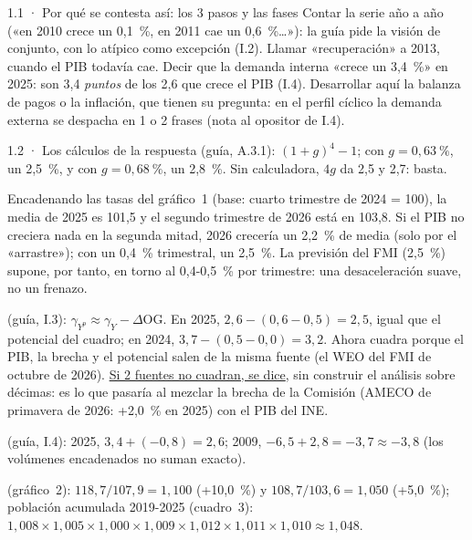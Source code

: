 \begin{complemento}{1.1 · Por qué se contesta así: los 3 pasos y las fases}
 Contar la serie año a año («en 2010 crece un 0,1~\%, en 2011 cae un 0,6~\%…»): la guía pide la visión de conjunto, con lo atípico como excepción (I.2). Llamar «recuperación» a 2013, cuando el PIB todavía cae. Decir que la demanda interna «crece un 3,4~\%» en 2025: son 3,4 \emph{puntos} de los 2,6 que crece el PIB (I.4). Desarrollar aquí la balanza de pagos o la inflación, que tienen su pregunta: en el perfil cíclico la demanda externa se despacha en 1 o 2 frases (nota al opositor de I.4).
\end{complemento}
\begin{complemento}{1.2 · Los cálculos de la respuesta}
 (guía, A.3.1): $(1+g)^4-1$; con $g=0{,}63~\%$, un 2,5~\%, y con $g=0{,}68~\%$, un 2,8~\%. Sin calculadora, $4g$ da 2,5 y 2,7: basta.

 Encadenando las tasas del gráfico~1 (base: cuarto trimestre de 2024 = 100), la media de 2025 es 101,5 y el segundo trimestre de 2026 está en 103,8. Si el PIB no creciera nada en la segunda mitad, 2026 crecería un 2,2~\% de media (solo por el «arrastre»); con un 0,4~\% trimestral, un 2,5~\%. La previsión del FMI (2,5~\%) supone, por tanto, en torno al 0,4-0,5~\% por trimestre: una desaceleración suave, no un frenazo.

 (guía, I.3): $\gamma_{Y^p}\approx\gamma_Y-\Delta\mathrm{OG}$. En 2025, $2{,}6-(0{,}6-0{,}5)=2{,}5$, igual que el potencial del cuadro; en 2024, $3{,}7-(0{,}5-0{,}0)=3{,}2$. Ahora cuadra porque el PIB, la brecha y el potencial salen de la misma fuente (el WEO del FMI de octubre de 2026). \uline{Si 2 fuentes no cuadran, se dice}, sin construir el análisis sobre décimas: es lo que pasaría al mezclar la brecha de la Comisión (AMECO de primavera de 2026: +2,0~\% en 2025) con el PIB del INE.

 (guía, I.4): 2025, $3{,}4+(-0{,}8)=2{,}6$; 2009, $-6{,}5+2{,}8=-3{,}7\approx-3{,}8$ (los volúmenes encadenados no suman exacto).

 (gráfico~2): $118{,}7/107{,}9=1{,}100$ (+10,0~\%) y $108{,}7/103{,}6=1{,}050$ (+5,0~\%); población acumulada 2019-2025 (cuadro~3): $1{,}008\times1{,}005\times1{,}000\times1{,}009\times1{,}012\times1{,}011\times1{,}010\approx1{,}048$.
\end{complemento}
